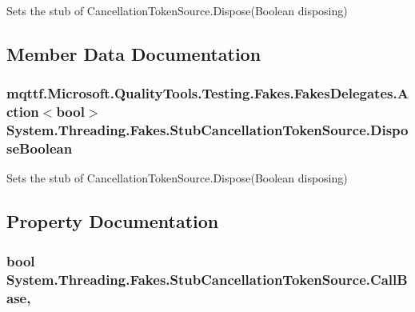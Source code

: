 Sets the stub of Cancellation\-Token\-Source.\-Dispose(\-Boolean disposing)



\subsection{Member Data Documentation}
\hypertarget{class_system_1_1_threading_1_1_fakes_1_1_stub_cancellation_token_source_a98e820f161a796bc49fc116fd7576563}{
\subsubsection[{Dispose\-Boolean}]{\setlength{\rightskip}{0pt plus 5cm}mqttf.\-Microsoft.\-Quality\-Tools.\-Testing.\-Fakes.\-Fakes\-Delegates.\-Action$<$bool$>$ System.\-Threading.\-Fakes.\-Stub\-Cancellation\-Token\-Source.\-Dispose\-Boolean}}\label{class_system_1_1_threading_1_1_fakes_1_1_stub_cancellation_token_source_a98e820f161a796bc49fc116fd7576563}


Sets the stub of Cancellation\-Token\-Source.\-Dispose(\-Boolean disposing)



\subsection{Property Documentation}
\hypertarget{class_system_1_1_threading_1_1_fakes_1_1_stub_cancellation_token_source_a9e66b234e3f3ac6ca9d1717681cd787f}{
\subsubsection[{Call\-Base}]{\setlength{\rightskip}{0pt plus 5cm}bool System.\-Threading.\-Fakes.\-Stub\-Cancellation\-Token\-Source.\-Call\-Base\hspace{0.3cm}{\ttfamily [get]}, {\ttfamily [set]}}}\label{class_system_1_1_threading_1_1_fakes_1_1_stub_cancellation_token_source_a9e66b234e3f3ac6ca9d1717681cd787f}


